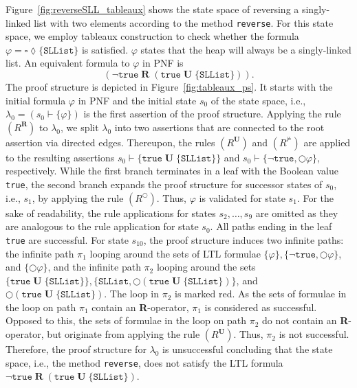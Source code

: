 \documentclass[a4paper, 12pt, twoside]{report}
\begin{document}
	Figure~\ref{fig:reverseSLL_tableaux} shows the state space of reversing a singly-linked list with two elements according to the method \texttt{reverse}. For this state space, we employ tableaux construction to check whether the formula $\varphi=\square \lozenge \{\texttt{SLList}\}$ is satisfied. $\varphi$ states that the heap will always be a singly-linked list. An equivalent formula to $\varphi$ in PNF is \[(\neg \texttt{true}\;\textbf{R}\;(\texttt{true}\;\textbf{U}\;\{\texttt{SLList}\})).\] The proof structure is depicted in Figure~\ref{fig:tableaux_ps}. It starts with the initial formula $\varphi$ in PNF and the initial state $s_0$ of the state space, i.e., $\lambda_0 = (s_0 \vdash \{\varphi\})$ is the first assertion of the proof structure. Applying the rule $(R^{\textbf{R}})$ to $\lambda_0$, we split $\lambda_0$ into two assertions that are connected to the root assertion via directed edges. Thereupon, the rules $(R^{\textbf{U}})$ and $(R^{\nvDash})$ are applied to the resulting assertions $s_0 \vdash \{\texttt{true}\;\textbf{U}\;\{\texttt{SLList}\}\}$ and  $s_0 \vdash \{\neg\texttt{true}, \bigcirc\varphi\}$, respectively. While the first branch terminates in a leaf with the Boolean value \texttt{true}, the second branch expands the proof structure for successor states of $s_0$, i.e., $s_1$, by applying the rule $(R^{\bigcirc})$. Thus, $\varphi$ is validated for state $s_1$. For the sake of readability, the rule applications for states $s_2, \dots, s_9$ are omitted as they are analogous to the rule application for state $s_0$. All paths ending in the leaf \texttt{true} are successful. For state $s_{10}$, the proof structure induces two infinite paths: the infinite path $\pi_1$ looping around the sets of LTL formulae $\{\varphi\}, \{\neg\texttt{true},\bigcirc\varphi\}$, and $\{\bigcirc\varphi\}$, and the infinite path $\pi_2$ looping around the sets $\{\texttt{true}\;\textbf{U}\;\{\texttt{SLList}\}\},\{\texttt{SLList}, \bigcirc(\texttt{true}\;\textbf{U}\;\{\texttt{SLList}\})\}$, and $\bigcirc(\texttt{true}\;\textbf{U}\;\{\texttt{SLList}\})$. The loop in $\pi_2$ is marked red. As the sets of formulae in the loop on path $\pi_1$ contain an \textbf{R}-operator, $\pi_1$ is considered as successful. Opposed to this, the sets of formulae in the loop on path $\pi_2$ do not contain an \textbf{R}-operator, but originate from applying the rule $(R^{\textbf{U}})$. Thus, $\pi_2$ is not successful. Therefore, the proof structure for $\lambda_0$ is unsuccessful concluding that the state space, i.e., the method \texttt{reverse}, does not satisfy the LTL formula $\neg\texttt{true}\;\textbf{R}\;(\texttt{true}\;\textbf{U}\;\{\texttt{SLList}\})$.\\
	
\end{document}
